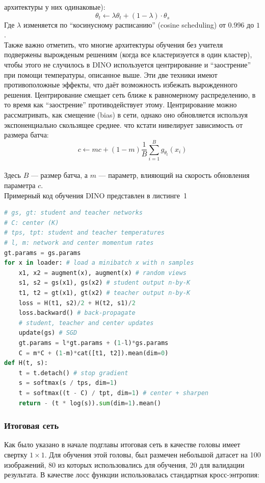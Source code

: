 архитектуры у них одинаковые):
\[\theta_t \leftarrow \lambda \theta_t + (1-\lambda)\cdot \theta_s\]
Где $\lambda$ изменяется по ``косинусному расписанию'' (cosine scheduling) от $0.996$ до $1$.
\\
\noindent Также важно отметить, что многие архитектуры обучения без учителя подвержены вырожденым решениям (когда все кластеризуется в один кластер), чтобы этого не случилось в 
DINO используется центрирование и ``заострение'' при помощи температуры, описанное выше. Эти две техники имеют противоположные эффекты, 
что даёт возможность избежать вырожденного решения. Центрирование смещает сеть ближе к равномерному распределению, в то время как ``заострение'' противодействует этому.
Центрирование можно рассматривать, как смещение (bias) в сети, однако оно обновляется используя экспоненциально скользящее среднее. что кстати нивелирует 
зависимость от размера батча:
\[c\leftarrow mc + (1-m)\frac{1}{B}\sum\limits_{i=1}^B g_{\theta_t}(x_i)\]
\\
Здесь $B$ --- размер батча, а $m$ --- параметр, влияющий на скорость обновления параметра $c$.
\\  
Примерный код обучения DINO представлен в листинге~1~\cite{DINO}


\begin{lstlisting}[label=algo1, language=Python, float=tp, caption={Алгоритм обучения DINO}]
# gs, gt: student and teacher networks
# C: center (K)
# tps, tpt: student and teacher temperatures
# l, m: network and center momentum rates
gt.params = gs.params
for x in loader: # load a minibatch x with n samples
    x1, x2 = augment(x), augment(x) # random views
    s1, s2 = gs(x1), gs(x2) # student output n-by-K
    t1, t2 = gt(x1), gt(x2) # teacher output n-by-K
    loss = H(t1, s2)/2 + H(t2, s1)/2
    loss.backward() # back-propagate
    # student, teacher and center updates
    update(gs) # SGD
    gt.params = l*gt.params + (1-l)*gs.params
    C = m*C + (1-m)*cat([t1, t2]).mean(dim=0)
def H(t, s):
    t = t.detach() # stop gradient
    s = softmax(s / tps, dim=1)
    t = softmax((t - C) / tpt, dim=1) # center + sharpen
    return - (t * log(s)).sum(dim=1).mean()
\end{lstlisting}

\subsubsection{Итоговая сеть}
Как было указано в начале подглавы итоговая сеть в качестве головы имеет свертку $1\times1$. Для обучения этой головы, был размечен небольшой 
датасет на 100 изображений, 80 из которых использовались для обучения, 20 для валидации результата. В качестве лосс функции использовалась стандартная кросс-энтропия:

